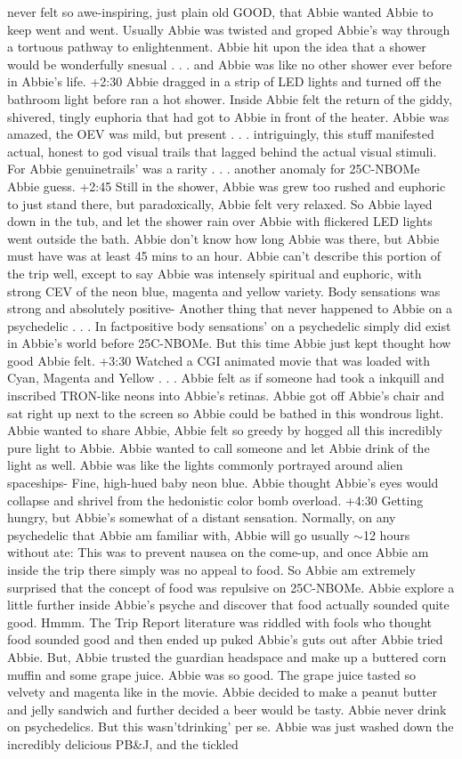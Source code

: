 \documentclass[12pt]{book}
\begin{document}
never felt so awe-inspiring, just plain old GOOD, that Abbie wanted Abbie to keep went and went. Usually Abbie was twisted and groped Abbie's way through a tortuous pathway to enlightenment. Abbie hit upon the idea that a shower would be wonderfully snesual . . .  and Abbie was like no other shower ever before in Abbie's life. +2:30 Abbie dragged in a strip of LED lights and turned off the bathroom light before ran a hot shower. Inside Abbie felt the return of the giddy, shivered, tingly euphoria that had got to Abbie in front of the heater. Abbie was amazed, the OEV was mild, but present . . .  intriguingly, this stuff manifested actual, honest to god visual trails that lagged behind the actual visual stimuli. For Abbie genuinetrails' was a rarity . . .  another anomaly for 25C-NBOMe Abbie guess. +2:45 Still in the shower, Abbie was grew too rushed and euphoric to just stand there, but paradoxically, Abbie felt very relaxed. So Abbie layed down in the tub, and let the shower rain over Abbie with flickered LED lights went outside the bath. Abbie don't know how long Abbie was there, but Abbie must have was at least 45 mins to an hour. Abbie can't describe this portion of the trip well, except to say Abbie was intensely spiritual and euphoric, with strong CEV of the neon blue, magenta and yellow variety. Body sensations was strong and absolutely positive- Another thing that never happened to Abbie on a psychedelic . . .  In factpositive body sensations' on a psychedelic simply did exist in Abbie's world before 25C-NBOMe. But this time Abbie just kept thought how good Abbie felt. +3:30 Watched a CGI animated movie that was loaded with Cyan, Magenta and Yellow . . .  Abbie felt as if someone had took a inkquill and inscribed TRON-like neons into Abbie's retinas. Abbie got off Abbie's chair and sat right up next to the screen so Abbie could be bathed in this wondrous light. Abbie wanted to share Abbie, Abbie felt so greedy by hogged all this incredibly pure light to Abbie. Abbie wanted to call someone and let Abbie drink of the light as well. Abbie was like the lights commonly portrayed around alien spaceships- Fine, high-hued baby neon blue. Abbie thought Abbie's eyes would collapse and shrivel from the hedonistic color bomb overload. +4:30 Getting hungry, but Abbie's somewhat of a distant sensation. Normally, on any psychedelic that Abbie am familiar with, Abbie will go usually $\sim$12 hours without ate: This was to prevent nausea on the come-up, and once Abbie am inside the trip there simply was no appeal to food. So Abbie am extremely surprised that the concept of food was repulsive on 25C-NBOMe. Abbie explore a little further inside Abbie's psyche and discover that food actually sounded quite good. Hmmm. The Trip Report literature was riddled with fools who thought food sounded good and then ended up puked Abbie's guts out after Abbie tried Abbie. But, Abbie trusted the guardian headspace and make up a buttered corn muffin and some grape juice. Abbie was so good. The grape juice tasted so velvety and magenta like in the movie. Abbie decided to make a peanut butter and jelly sandwich and further decided a beer would be tasty. Abbie never drink on psychedelics. But this wasn'tdrinking' per se. Abbie was just washed down the incredibly delicious PB\&J, and the tickled 
\end{document}
